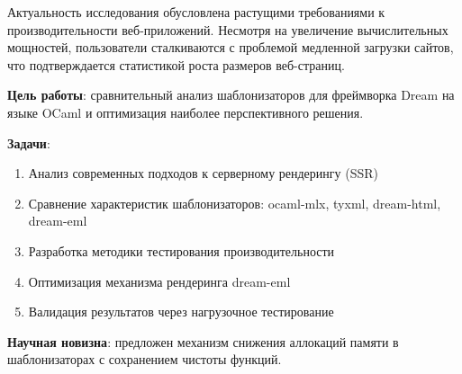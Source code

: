 Актуальность исследования обусловлена растущими требованиями к производительности веб-приложений. Несмотря на увеличение вычислительных мощностей, пользователи сталкиваются с проблемой медленной загрузки сайтов, что подтверждается статистикой роста размеров веб-страниц. 

\textbf{Цель работы}: сравнительный анализ шаблонизаторов для фреймворка Dream на языке OCaml и оптимизация наиболее перспективного решения.

\textbf{Задачи}:
\begin{enumerate}
    \item Анализ современных подходов к серверному рендерингу (SSR)
    \item Сравнение характеристик шаблонизаторов: ocaml-mlx, tyxml, dream-html, dream-eml
    \item Разработка методики тестирования производительности
    \item Оптимизация механизма рендеринга dream-eml
    \item Валидация результатов через нагрузочное тестирование
\end{enumerate}

\textbf{Научная новизна}: предложен механизм снижения аллокаций памяти в шаблонизаторах с сохранением чистоты функций.